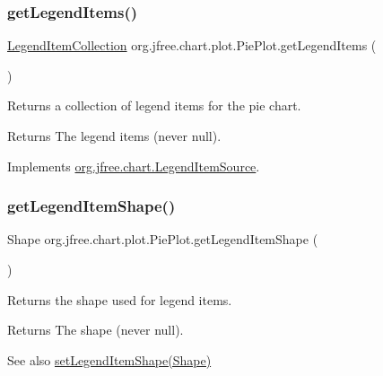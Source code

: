 \subsubsection{\texorpdfstring{get\+Legend\+Items()}{getLegendItems()}}
{\footnotesize\ttfamily \mbox{\hyperlink{classorg_1_1jfree_1_1chart_1_1_legend_item_collection}{Legend\+Item\+Collection}} org.\+jfree.\+chart.\+plot.\+Pie\+Plot.\+get\+Legend\+Items (\begin{DoxyParamCaption}{ }\end{DoxyParamCaption})}

Returns a collection of legend items for the pie chart.

\begin{DoxyReturn}{Returns}
The legend items (never {\ttfamily null}). 
\end{DoxyReturn}


Implements \mbox{\hyperlink{interfaceorg_1_1jfree_1_1chart_1_1_legend_item_source_a224409463c4f7a8ef0e2a9df337e6d3b}{org.\+jfree.\+chart.\+Legend\+Item\+Source}}.

\mbox{\label{classorg_1_1jfree_1_1chart_1_1plot_1_1_pie_plot_a1ad79d0ab422bb702082bc5bde4ff8e2}} 
\subsubsection{\texorpdfstring{get\+Legend\+Item\+Shape()}{getLegendItemShape()}}
{\footnotesize\ttfamily Shape org.\+jfree.\+chart.\+plot.\+Pie\+Plot.\+get\+Legend\+Item\+Shape (\begin{DoxyParamCaption}{ }\end{DoxyParamCaption})}

Returns the shape used for legend items.

\begin{DoxyReturn}{Returns}
The shape (never {\ttfamily null}).
\end{DoxyReturn}
\begin{DoxySeeAlso}{See also}
\mbox{\hyperlink{classorg_1_1jfree_1_1chart_1_1plot_1_1_pie_plot_a017e05045841e9e069d9ac5a50a7d5b1}{set\+Legend\+Item\+Shape(\+Shape)}} 
\end{DoxySeeAlso}
\mbox{\label{classorg_1_1jfree_1_1chart_1_1plot_1_1_pie_plot_a9045ce4cc30829ab6e83633a0c232299}} 
